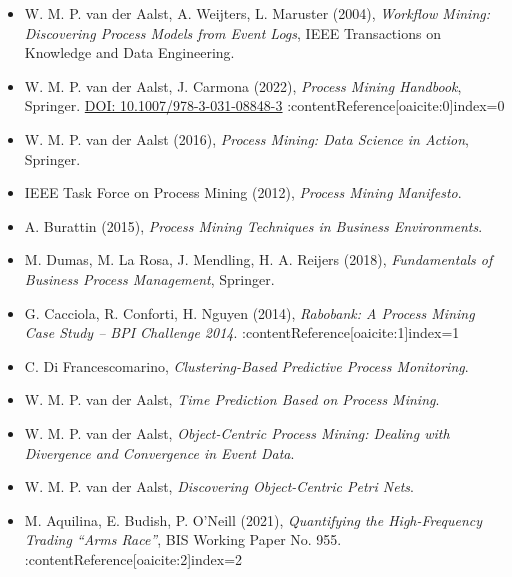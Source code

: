 \documentclass[10pt,final]{article}
\begin{document}
\begin{itemize}

\item W. M. P. van der Aalst, A. Weijters, L. Maruster (2004), 
\textit{Workflow Mining: Discovering Process Models from Event Logs}, 
IEEE Transactions on Knowledge and Data Engineering.

\item W. M. P. van der Aalst, J. Carmona (2022), 
\textit{Process Mining Handbook}, Springer. 
\href{https://doi.org/10.1007/978-3-031-08848-3}{DOI: 10.1007/978-3-031-08848-3}
:contentReference[oaicite:0]{index=0}

\item W. M. P. van der Aalst (2016), 
\textit{Process Mining: Data Science in Action}, Springer.

\item IEEE Task Force on Process Mining (2012), 
\textit{Process Mining Manifesto}.

\item A. Burattin (2015), 
\textit{Process Mining Techniques in Business Environments}.

\item M. Dumas, M. La Rosa, J. Mendling, H. A. Reijers (2018), 
\textit{Fundamentals of Business Process Management}, Springer.

\item G. Cacciola, R. Conforti, H. Nguyen (2014), 
\textit{Rabobank: A Process Mining Case Study – BPI Challenge 2014}.
:contentReference[oaicite:1]{index=1}

\item C. Di Francescomarino, 
\textit{Clustering-Based Predictive Process Monitoring}.

\item W. M. P. van der Aalst, 
\textit{Time Prediction Based on Process Mining}.

\item W. M. P. van der Aalst, 
\textit{Object-Centric Process Mining: Dealing with Divergence and Convergence in Event Data}.

\item W. M. P. van der Aalst, 
\textit{Discovering Object-Centric Petri Nets}.

\item M. Aquilina, E. Budish, P. O’Neill (2021), 
\textit{Quantifying the High-Frequency Trading “Arms Race”}, BIS Working Paper No. 955.
:contentReference[oaicite:2]{index=2}

\end{itemize}
\end{document}
